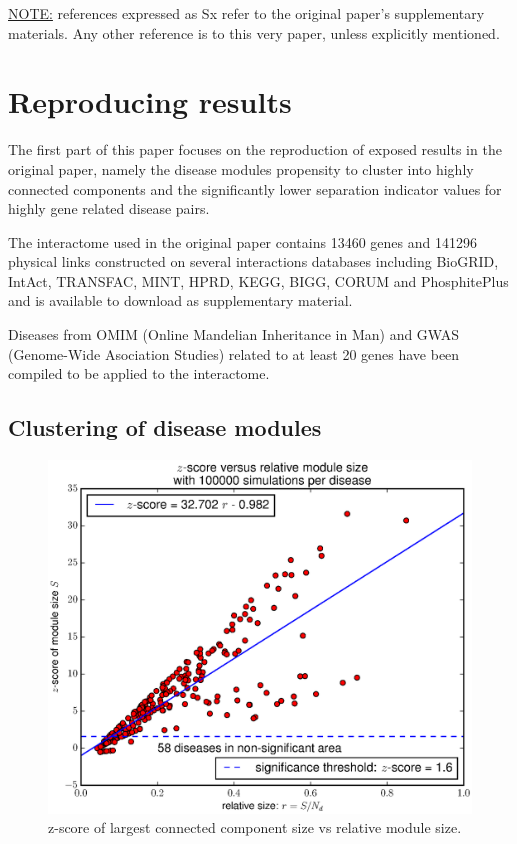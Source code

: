 \documentclass[letterpaper]{article}
\begin{document}
\underline{NOTE:} references expressed as Sx refer to the original paper's supplementary materials. Any
other reference is to this very paper, unless explicitly mentioned.

\section{Reproducing results}
The first part of this paper focuses on the reproduction of exposed results in the original paper,
namely the disease modules propensity to cluster into highly connected components and the significantly
lower separation indicator values for highly gene related disease pairs.

The interactome used in the original paper contains 13460 genes and 141296 physical links constructed on several
interactions databases including BioGRID, IntAct, TRANSFAC, MINT, HPRD, KEGG, BIGG, CORUM and PhosphitePlus and
is available to download as supplementary material.

Diseases from OMIM (Online Mandelian Inheritance in Man) and GWAS (Genome-Wide Asociation Studies)
related to at least 20 genes have been compiled to be applied to the interactome.

	\subsection{Clustering of disease modules}\label{subsec:clustering of disease modules}

	\begin{figure}[!h]
		\includegraphics[width=.5\textwidth]{images/S4.b100000.eps}
		\caption{z-score of largest connected component size vs relative module size.\label{fig:zscore}}
	\end{figure}
\end{document}

